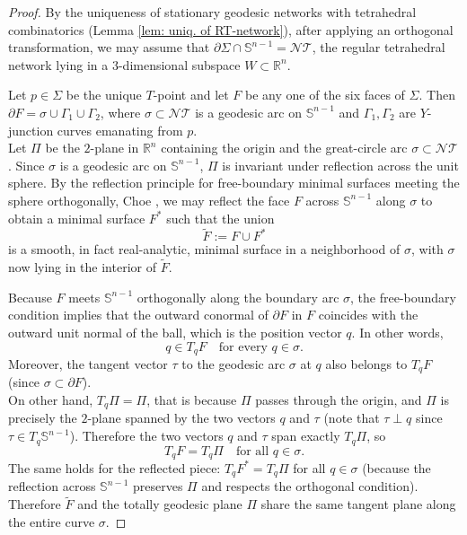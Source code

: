 \documentclass[11pt]{amsart}
\numberwithin{equation}{section}
\theoremstyle{theorem}
\theoremstyle{definition}
\numberwithin{equation}{section}
\begin{document}
\begin{proof}
By the uniqueness of stationary geodesic networks with tetrahedral combinatorics (Lemma \ref{lem: uniq. of RT-network}), after applying an orthogonal transformation, we may assume that \(\partial \Sigma \cap \mathbb{S}^{n-1} = \mathcal{NT}\), the regular tetrahedral network lying in a $3$-dimensional subspace $W \subset \mathbb{R}^n$.
\medskip

Let \(p \in \Sigma\) be the unique $T$-point and let \(F\) be any one of the six faces of \(\Sigma\). Then \(\partial F = \sigma \cup \Gamma_1 \cup \Gamma_2\), where \(\sigma \subset \mathcal{NT}\) is a geodesic arc on \(\mathbb{S}^{n-1}\) and \(\Gamma_1, \Gamma_2\) are $Y$-junction curves emanating from \(p\).\\
Let \(\Pi\) be the $2$-plane in \(\mathbb{R}^n\) containing the origin and the great-circle arc \(\sigma \subset \mathcal{NT}\). Since \(\sigma\) is a geodesic arc on \(\mathbb{S}^{n-1}\), \(\Pi\) is invariant under reflection across the unit sphere. By the reflection principle for free-boundary minimal surfaces meeting the sphere orthogonally, Choe \cite{choe2025free}, we may reflect the face \(F\) across \(\mathbb{S}^{n-1}\) along \(\sigma\) to obtain a minimal surface \(F^*\) such that the union
\[
\widetilde{F} := F \cup F^*
\]
is a smooth, in fact real-analytic, minimal surface in a neighborhood of \(\sigma\), with \(\sigma\) now lying in the interior of \(\widetilde{F}\).
\medskip

Because \(F\) meets \(\mathbb{S}^{n-1}\) orthogonally along the boundary arc \(\sigma\), the free-boundary condition implies that the outward conormal of \(\partial F\) in \(F\) coincides with the outward unit normal of the ball, which is the position vector \(q\). In other words,
\[
q \in T_q F \quad \text{for every } q \in \sigma.
\]
Moreover, the tangent vector \(\tau\) to the geodesic arc \(\sigma\) at \(q\) also belongs to \(T_q F\) (since \(\sigma \subset \partial F\)).\\
On other hand,  \(T_q \Pi = \Pi\), that is because \(\Pi\) passes through the origin, and \(\Pi\) is precisely the $2$-plane spanned by the two vectors \(q\) and \(\tau\) (note that \(\tau \perp q\) since \(\tau \in T_q \mathbb{S}^{n-1}\)). Therefore the two vectors \(q\) and \(\tau\) span exactly \(T_q \Pi\), so
\[
T_q F = T_q \Pi \quad \text{for all } q \in \sigma.
\]
The same holds for the reflected piece: \(T_q F^* = T_q \Pi\) for all \(q \in \sigma\) (because the reflection across \(\mathbb{S}^{n-1}\) preserves \(\Pi\) and respects the orthogonal condition). Therefore \(\widetilde{F}\) and the totally geodesic plane \(\Pi\) share the same tangent plane along the entire curve \(\sigma\).
\medskip


\end{proof}
\end{document}
